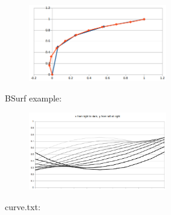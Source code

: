 \documentclass[12pt, a4paper]{article}
\begin{document}
\begin{center}
\begin{figure}[H]
\centering\includegraphics[width=6cm]{./cloud3.png}\\
\end{figure}
\end{center}
BSurf example:\\
\begin{center}
\begin{figure}[H]
\centering\includegraphics[width=6cm]{./bsurf.png}\\
\end{figure}
\end{center}

curve.txt:\\
\begin{scriptsize}
\begin{ttfamily}

\end{ttfamily}
\end{scriptsize}
\end{document}

